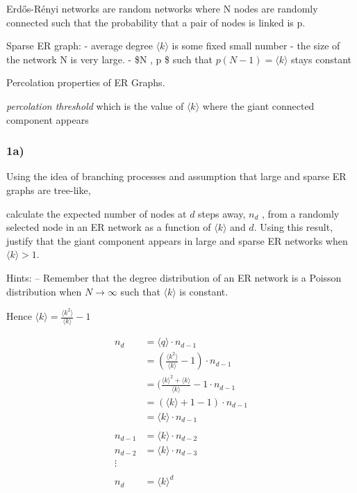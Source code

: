 \documentclass[11pt]{article}
\begin{document}
Erdős-Rényi networks are random networks where N nodes are randomly
connected such that the probability that a pair of nodes is linked is p.

Sparse ER graph: - average degree \(\langle k \rangle\) is some fixed
small number - the size of the network N is very large. - \$N
\rightarrow \infty, p \rightarrow \infty \$ such that
\(p(N-1) = \langle k \rangle\) stays constant

Percolation properties of ER Graphs.

\emph{percolation threshold} which is the value of \(\langle k \rangle\)
where the giant connected component appears

    \subsubsection{1a)}\label{a}

Using the idea of branching processes and assumption that large and
sparse ER graphs are tree-like,

calculate the expected number of nodes at \(d\) steps away, \(n_d\) ,
from a randomly selected node in an ER network as a function of
\(\langle k \rangle\) and \(d\). Using this result, justify that the
giant component appears in large and sparse ER networks when
\(\langle k \rangle > 1\).

Hints: -- Remember that the degree distribution of an ER network is a
Poisson distribution when \(N \rightarrow \infty\) such that
\(\langle k \rangle\) is constant.

Hence
\(\langle k \rangle = \frac{\langle k^2 \rangle}{\langle k \rangle} - 1\)

    \[\begin{aligned}
n_d & = \langle q \rangle \cdot n_{d-1}\\
& = (\frac{\langle k^2 \rangle}{\langle k \rangle} - 1) \cdot n_{d-1}\\
& = (\frac{\langle k \rangle^2 + \langle k \rangle}{\langle k \rangle} - 1 \cdot n_{d-1}\\
& =  (\langle k \rangle + 1 -1 )\cdot n_{d-1}\\
& =  \langle k \rangle\cdot n_{d-1}
\\\\
n_{d-1} & = \langle k \rangle\cdot n_{d-2}\\
n_{d-2} & = \langle k \rangle\cdot n_{d-3}\\
\vdots &\\\\
n_d & = \langle k \rangle^d
\end{aligned}
\]
\end{document}
